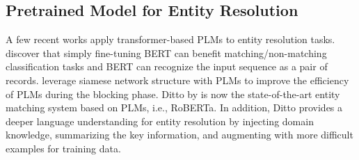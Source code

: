 
\subsection{Pretrained Model for Entity Resolution}


A few recent works apply transformer-based PLMs to entity resolution tasks. \citet{paganelli_analyzing_2022} discover that simply fine-tuning BERT can benefit matching/non-matching classification tasks and BERT can recognize the input sequence as a pair of records. \citet{li_improving_2021} leverage siamese network structure with PLMs to improve the efficiency of PLMs during the blocking phase. 
Ditto by \cite{li_deep_2020} is now the state-of-the-art entity matching system based on PLMs, i.e., RoBERTa. In addition, Ditto provides a deeper language understanding for entity resolution by injecting domain knowledge, summarizing the key information, and augmenting with more difficult examples for training data. 
 
\vspace{-0.5em}
